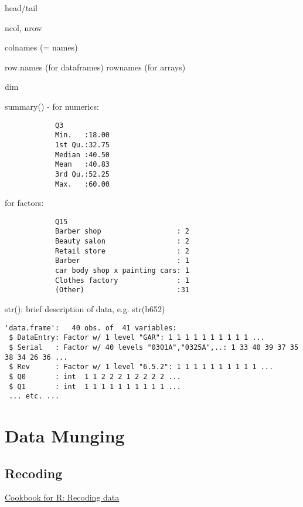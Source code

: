 head/tail

ncol, nrow

colnames (= names)

row.names (for dataframes)
rownames (for arrays)

dim

summary() - for numerics:
\begin{verbatim}
            Q3                                
            Min.   :18.00                           
            1st Qu.:32.75                           
            Median :40.50                           
            Mean   :40.83                           
            3rd Qu.:52.25                           
            Max.   :60.00  
\end{verbatim}

for factors:
\begin{verbatim}
            Q15    
            Barber shop                  : 2  
            Beauty salon                 : 2  
            Retail store                 : 2              
            Barber                       : 1              
            car body shop x painting cars: 1              
            Clothes factory              : 1              
            (Other)                      :31              
\end{verbatim}

str(): brief description of data, e.g.
str(b652)

\begin{verbatim}
'data.frame':	40 obs. of  41 variables:
 $ DataEntry: Factor w/ 1 level "GAR": 1 1 1 1 1 1 1 1 1 1 ...
 $ Serial   : Factor w/ 40 levels "0301A","0325A",..: 1 33 40 39 37 35 38 34 26 36 ...
 $ Rev      : Factor w/ 1 level "6.5.2": 1 1 1 1 1 1 1 1 1 1 ...
 $ Q0       : int  1 1 2 2 2 1 2 2 2 2 ...
 $ Q1       : int  1 1 1 1 1 1 1 1 1 1 ...
 ... etc. ...
\end{verbatim}

\section{Data Munging}

\subsection{Recoding}

\href{http://www.cookbook-r.com/Manipulating\_data/Recoding\_data/}{Cookbook for R: Recoding data}

